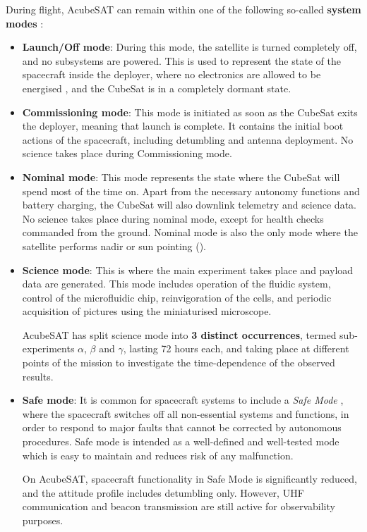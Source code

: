 \documentclass[a4paper,nobib,final]{tufte-book}
\begin{document}
During flight, AcubeSAT can remain within one of the following so-called \textbf{system modes} \autocite{MDO}:
\begin{itemize}
	\item \textbf{Launch/Off mode}: During this mode, the satellite is turned completely off, and no subsystems are powered. This is used to represent the state of the spacecraft inside the deployer, where no electronics are allowed to be energised \autocite[req. 3.3.3]{CDS13}, and the CubeSat is in a completely dormant state.
	
	\item \textbf{Commissioning mode}: This mode is initiated as soon as the CubeSat exits the deployer, meaning that launch is complete. It contains the initial boot actions of the spacecraft, including detumbling and antenna deployment. No science takes place during Commissioning mode.
	
	\item \textbf{Nominal mode}: This mode represents the state where the CubeSat will spend most of the time on. Apart from the necessary autonomy functions and battery charging, the CubeSat will also downlink telemetry and science data. No science takes place during nominal mode, except for health checks commanded from the ground. Nominal mode is also the only mode where the satellite performs nadir or sun pointing ().
	
	\item \textbf{Science mode}: This is where the main experiment takes place and payload data are generated. This mode includes operation of the fluidic system, control of the microfluidic chip, reinvigoration of the cells, and periodic acquisition of pictures using the miniaturised microscope.
	
	AcubeSAT has split science mode into \textbf{3 distinct occurrences}, termed sub-experiments \(\alpha\), \(\beta\) and \(\gamma\), lasting 72 hours each, and taking place at different points of the mission to investigate the time-dependence of the observed results.
	
	\item \textbf{Safe mode}: It is common for spacecraft systems to include a \emph{Safe Mode} \autocite[385]{aguirre_introduction_space_2013}, where the spacecraft switches off all non-essential systems and functions, in order to respond to major faults that cannot be corrected by autonomous procedures. Safe mode is intended as a well-defined and well-tested mode which is easy to maintain and reduces risk of any malfunction.
	
	On AcubeSAT, spacecraft functionality in Safe Mode is significantly reduced, and the attitude profile includes detumbling only. However, \ac{UHF} communication and beacon transmission are still active for observability purposes.
\end{itemize}
\end{document}
